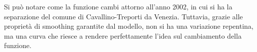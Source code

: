 \documentclass[a4paper,11pt,twoside,openright]{book}							%
\begin{document}
Si può notare come la funzione cambi attorno all'anno 2002, in cui si ha la separazione del comune di Cavallino-Treporti da Venezia. Tuttavia, grazie alle proprietà di smoothing garantite dal modello, non si ha una variazione repentina, ma una curva che riesce a rendere perfettamente l'idea sul cambiamento della funzione.
\end{document}

